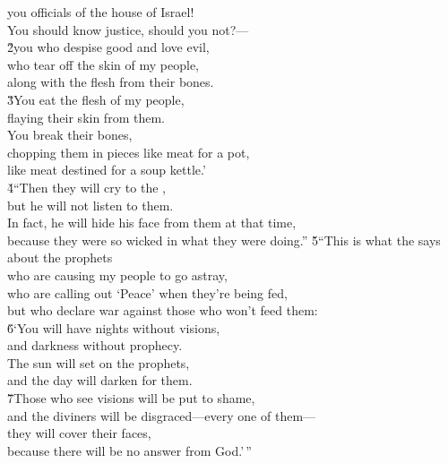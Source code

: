 \begin{poetry}
\poeml you officials of the house of Israel! \\
\poeml You should know justice, should you not?--- \\
\poeml \v{2}you who despise good and love evil, \\
\poemll    who tear off the skin of my people, \\
\poemlll       along with the flesh from their bones. \\
\poeml \v{3}You eat the flesh of my people, \\
\poemll    flaying their skin from them. \\
\poeml You break their bones, \\
\poemll    chopping them in pieces like meat for a pot, \\
\poemlll       like meat destined for a soup kettle.' \\
\poeml \v{4}``Then they will cry to the , \\
\poemll    but he will not listen to them. \\
\poeml In fact, he will hide his face from them at that time, \\
\poemll    because they were so wicked in what they were doing.''
\poeml \v{5}``This is what the  says about the prophets \\
\poemll    who are causing my people to go astray, \\
\poeml who are calling out `Peace' when they're being fed, \\
\poemll    but who declare war against those who won't feed them: \\
\poeml \v{6}`You will have nights without visions, \\
\poemll    and darkness without prophecy. \\
\poeml The sun will set on the prophets, \\
\poemll    and the day will darken for them. \\
\poeml \v{7}Those who see visions will be put to shame, \\
\poemll    and the diviners will be disgraced---every one of them--- \\
\poeml they will cover their faces, \\
\poemll    because there will be no answer from God.'\,''

\end{poetry}
